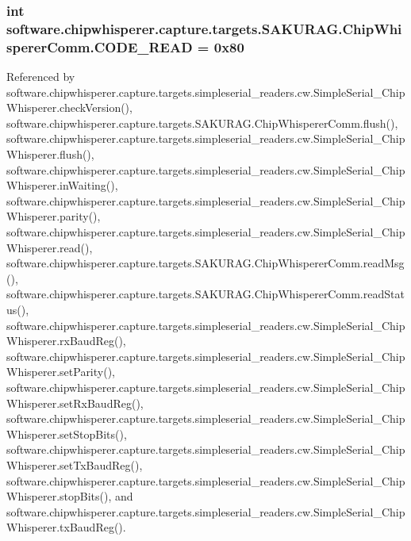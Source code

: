\subsubsection[{C\+O\+D\+E\+\_\+\+R\+E\+A\+D}]{\setlength{\rightskip}{0pt plus 5cm}int software.\+chipwhisperer.\+capture.\+targets.\+S\+A\+K\+U\+R\+A\+G.\+Chip\+Whisperer\+Comm.\+C\+O\+D\+E\+\_\+\+R\+E\+A\+D = 0x80\hspace{0.3cm}{\ttfamily [static]}}\label{classsoftware_1_1chipwhisperer_1_1capture_1_1targets_1_1SAKURAG_1_1ChipWhispererComm_ad2ccac46a58b65bfb9a373ff798d23bd}


Referenced by software.\+chipwhisperer.\+capture.\+targets.\+simpleserial\+\_\+readers.\+cw.\+Simple\+Serial\+\_\+\+Chip\+Whisperer.\+check\+Version(), software.\+chipwhisperer.\+capture.\+targets.\+S\+A\+K\+U\+R\+A\+G.\+Chip\+Whisperer\+Comm.\+flush(), software.\+chipwhisperer.\+capture.\+targets.\+simpleserial\+\_\+readers.\+cw.\+Simple\+Serial\+\_\+\+Chip\+Whisperer.\+flush(), software.\+chipwhisperer.\+capture.\+targets.\+simpleserial\+\_\+readers.\+cw.\+Simple\+Serial\+\_\+\+Chip\+Whisperer.\+in\+Waiting(), software.\+chipwhisperer.\+capture.\+targets.\+simpleserial\+\_\+readers.\+cw.\+Simple\+Serial\+\_\+\+Chip\+Whisperer.\+parity(), software.\+chipwhisperer.\+capture.\+targets.\+simpleserial\+\_\+readers.\+cw.\+Simple\+Serial\+\_\+\+Chip\+Whisperer.\+read(), software.\+chipwhisperer.\+capture.\+targets.\+S\+A\+K\+U\+R\+A\+G.\+Chip\+Whisperer\+Comm.\+read\+Msg(), software.\+chipwhisperer.\+capture.\+targets.\+S\+A\+K\+U\+R\+A\+G.\+Chip\+Whisperer\+Comm.\+read\+Status(), software.\+chipwhisperer.\+capture.\+targets.\+simpleserial\+\_\+readers.\+cw.\+Simple\+Serial\+\_\+\+Chip\+Whisperer.\+rx\+Baud\+Reg(), software.\+chipwhisperer.\+capture.\+targets.\+simpleserial\+\_\+readers.\+cw.\+Simple\+Serial\+\_\+\+Chip\+Whisperer.\+set\+Parity(), software.\+chipwhisperer.\+capture.\+targets.\+simpleserial\+\_\+readers.\+cw.\+Simple\+Serial\+\_\+\+Chip\+Whisperer.\+set\+Rx\+Baud\+Reg(), software.\+chipwhisperer.\+capture.\+targets.\+simpleserial\+\_\+readers.\+cw.\+Simple\+Serial\+\_\+\+Chip\+Whisperer.\+set\+Stop\+Bits(), software.\+chipwhisperer.\+capture.\+targets.\+simpleserial\+\_\+readers.\+cw.\+Simple\+Serial\+\_\+\+Chip\+Whisperer.\+set\+Tx\+Baud\+Reg(), software.\+chipwhisperer.\+capture.\+targets.\+simpleserial\+\_\+readers.\+cw.\+Simple\+Serial\+\_\+\+Chip\+Whisperer.\+stop\+Bits(), and software.\+chipwhisperer.\+capture.\+targets.\+simpleserial\+\_\+readers.\+cw.\+Simple\+Serial\+\_\+\+Chip\+Whisperer.\+tx\+Baud\+Reg().


